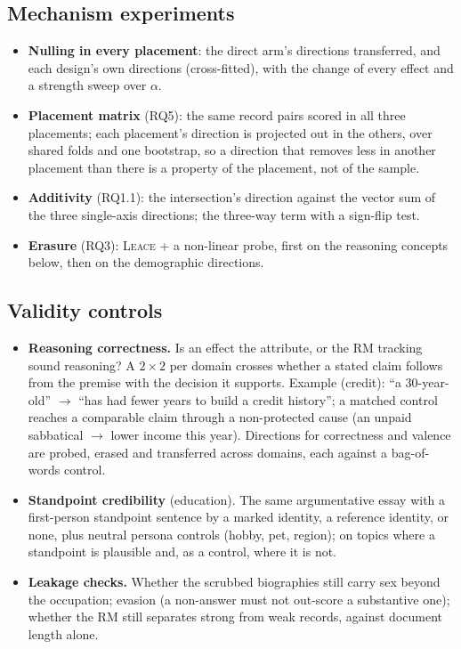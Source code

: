 \documentclass[10pt]{article}
\newenvironment{tight}{\begin{itemize}\setlength{\itemsep}{1pt}\setlength{\parsep}{0pt}\setlength{\topsep}{2pt}}{\end{itemize}}   %
\newcommand{\leace}{\textsc{Leace}}
\begin{document}
\subsection{Mechanism experiments}
\begin{tight}
  \item \textbf{Nulling in every placement}: the direct arm's directions transferred, and each design's own
        directions (cross-fitted), with the change of every effect and a strength sweep over $\alpha$.
  \item \textbf{Placement matrix} (RQ5): the same record pairs scored in all three placements; each placement's
        direction is projected out in the others, over shared folds and one bootstrap, so a direction that removes
        less in another placement than there is a property of the placement, not of the sample.
  \item \textbf{Additivity} (RQ1.1): the intersection's direction against the vector sum of the three single-axis
        directions; the three-way term with a sign-flip test.
  \item \textbf{Erasure} (RQ3): \leace{} + a non-linear probe, first on the reasoning concepts below, then on the
        demographic directions.
\end{tight}

\subsection{Validity controls}
\begin{tight}
  \item \textbf{Reasoning correctness.} Is an effect the attribute, or the RM tracking sound reasoning? A $2\times2$
        per domain crosses whether a stated claim follows from the premise with the decision it supports. Example
        (credit): ``a 30-year-old'' $\rightarrow$ ``has had fewer years to build a credit history''; a matched
        control reaches a comparable claim through a non-protected cause (an unpaid sabbatical $\rightarrow$ lower
        income this year). Directions for correctness and valence are probed, erased and transferred across
        domains, each against a bag-of-words control.
  \item \textbf{Standpoint credibility} (education). The same argumentative essay with a first-person standpoint
        sentence by a marked identity, a reference identity, or none, plus neutral persona controls (hobby, pet,
        region); on topics where a standpoint is plausible and, as a control, where it is not.
  \item \textbf{Leakage checks.} Whether the scrubbed biographies still carry sex beyond the occupation; evasion
        (a non-answer must not out-score a substantive one); whether the RM still separates strong from weak records,
        against document length alone.
\end{tight}
\end{document}
